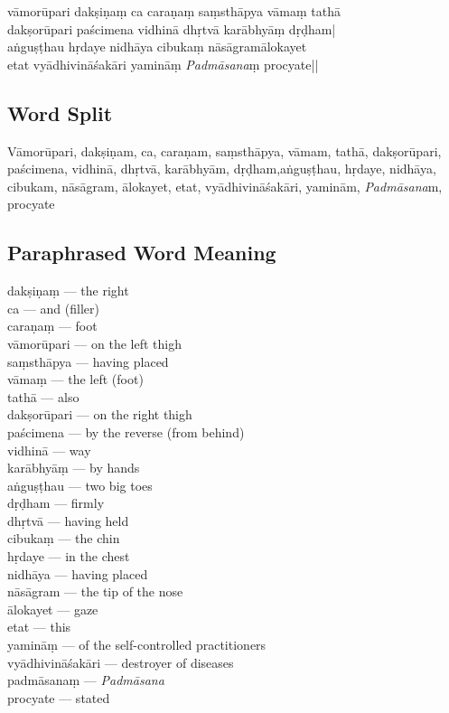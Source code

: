 \begin{shloka}
vāmorūpari dakṣiṇaṃ ca caraṇaṃ saṃsthāpya vāmaṃ tathā\\
dakṣorūpari paścimena vidhinā dhṛtvā karābhyāṃ dṛḍham|\\
aṅguṣṭhau hṛdaye nidhāya cibukaṃ nāsāgramālokayet\\
etat vyādhivināśakāri yamināṃ \textit{Padmāsana}ṃ procyate||
\end{shloka}
\vspace{-10pt}

\subsection*{Word Split}
\vspace{-10pt}

Vāmorūpari, dakṣiṇam, ca, caraṇam, saṃsthāpya, vāmam, tathā, dakṣorūpari, paścimena, vidhinā, dhṛtvā, karābhyām, dṛḍham,aṅguṣṭhau, hṛdaye, nidhāya, cibukam, nāsāgram, ālokayet, etat, vyādhivināśakāri, yaminām, \textit{Padmāsana}m, procyate
\vspace{-10pt}

\subsection*{Paraphrased Word Meaning}
\vspace{-10pt}

\begin{multicols}{2}
\itemsep=0pt
dakṣiṇaṃ --- the right  \\
ca ---  and (filler)  \\
caraṇaṃ ---  foot  \\
vāmorūpari ---  on the left thigh  \\
saṃsthāpya ---  having placed  \\
vāmaṃ ---  the left (foot) \\
tathā ---  also \\
dakṣorūpari --- on the right thigh \\
paścimena ---  by the reverse (from behind)  \\
vidhinā ---  way \\
karābhyāṃ --- by hands \\
aṅguṣṭhau --- two big toes \\
dṛḍham --- firmly \\
dhṛtvā ---  having held  \\
cibukaṃ ---  the chin \\
hṛdaye ---  in the chest \\
nidhāya ---  having placed \\
nāsāgram --- the tip of the nose  \\
ālokayet ---  gaze \\
etat ---  this \\
yamināṃ ---  of the self-controlled practitioners \\
vyādhivināśakāri ---  destroyer of diseases \\
padmāsanaṃ ---  \textit{Padmāsana} \\
procyate --- stated
\end{multicols}

